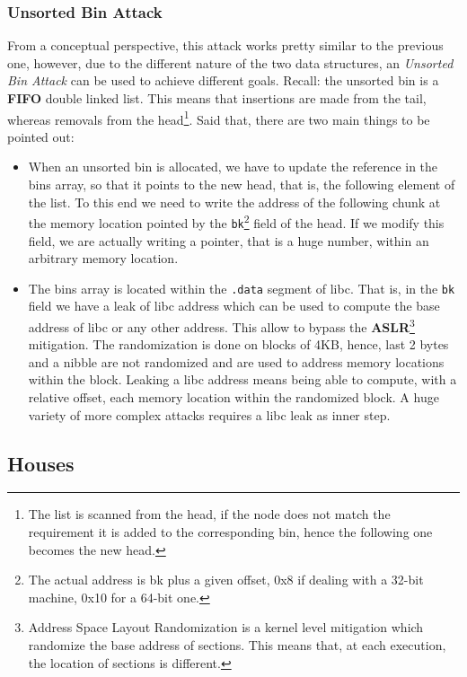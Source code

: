\documentclass{article}
\numberwithin{equation}{subsection}
\begin{document}
\subsubsection{Unsorted Bin Attack}
From a conceptual perspective, this attack works pretty similar to the previous one, however, due to the different nature of the two data structures, an \emph{Unsorted Bin Attack} can be used to achieve different goals. Recall: the unsorted bin is a \textbf{FIFO} double linked list. This means that insertions are made from the tail, whereas removals from the head\footnote{The list is scanned from the head, if the node does not match the requirement it is added to the corresponding bin, hence the following one becomes the new head.}. Said that, there are two main things to be pointed out:
\begin{itemize}
    \item When an unsorted bin is allocated, we have to update the reference in the bins array, so that it points to the new head, that is, the following element of the list. To this end we need to write the address of the following chunk at the memory location pointed by the \texttt{bk}\footnote{The actual address is bk plus a given offset, 0x8 if dealing with a 32-bit machine, 0x10 for a 64-bit one.} field of the head. If we modify this field, we are actually writing a pointer, that is a huge number, within an arbitrary memory location. 
    \item The bins array is located within the \texttt{.data} segment of libc. That is, in the \texttt{bk} field we have a leak of libc address which can be used to compute the base address of libc or any other address. This allow to bypass the \textbf{ASLR}\footnote{Address Space Layout Randomization is a kernel level mitigation which randomize the base address of sections. This means that, at each execution, the location of sections is different.} mitigation. The randomization is done on blocks of 4KB, hence, last 2 bytes and a nibble are not randomized and are used to address memory locations within the block. Leaking a libc address means being able to compute, with a relative offset, each memory location within the randomized block. A huge variety of more complex attacks requires a libc leak as inner step.
\end{itemize}
\clearpage
\subsection{Houses}
\label{house-of-force}
\end{document}

